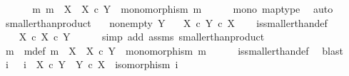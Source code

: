 \begin{isabellebody}
\ \ \isamarkupfalse%
\isanewline
\isanewline
\ \ \isamarkupfalse%
\ {\isachardoublequoteopen}{\isasymexists}m{\isachardot}{\kern0pt}\ m\ {\isacharcolon}{\kern0pt}\ X\ {\isasymrightarrow}\ X\ {\isasymtimes}\isactrlsub c\ Y\ {\isasymand}\ monomorphism\ m{\isachardoublequoteclose}\isanewline
\ \ \ \ \isamarkupfalse%
\ mono\ map{\isacharunderscore}{\kern0pt}type\ \isamarkupfalse%
\ auto\isanewline
{}\isamarkupfalse%
%
\endisatagproof
{\isafoldproof}%
%
\isadelimproof
\isanewline
%
\endisadelimproof
\isanewline
{}\isamarkupfalse%
\ smaller{\isacharunderscore}{\kern0pt}than{\isacharunderscore}{\kern0pt}product{}{\isacharcolon}{\kern0pt}\isanewline
\ \ \ {\isachardoublequoteopen}nonempty\ Y{\isachardoublequoteclose}\isanewline
\ \ \ {\isachardoublequoteopen}X\ {\isasymle}\isactrlsub c\ Y\ {\isasymtimes}\isactrlsub c\ X{\isachardoublequoteclose}\isanewline
%
\isadelimproof
\ \ %
\endisadelimproof
%
\isatagproof
{}\isamarkupfalse%
\ is{\isacharunderscore}{\kern0pt}smaller{\isacharunderscore}{\kern0pt}than{\isacharunderscore}{\kern0pt}def\ \ \isanewline
{}\isamarkupfalse%
\ {\isacharminus}{\kern0pt}\ \isanewline
\ \ \isamarkupfalse%
\ {\isachardoublequoteopen}X\ {\isasymle}\isactrlsub c\ X\ {\isasymtimes}\isactrlsub c\ Y{\isachardoublequoteclose}\isanewline
\ \ \ \ \isamarkupfalse%
\ {\isacharparenleft}{\kern0pt}simp\ add{\isacharcolon}{\kern0pt}\ assms\ smaller{\isacharunderscore}{\kern0pt}than{\isacharunderscore}{\kern0pt}product{}{\isacharparenright}{\kern0pt}\isanewline
\ \ \isamarkupfalse%
\ \isamarkupfalse%
\ m\ \ m{\isacharunderscore}{\kern0pt}def{\isacharcolon}{\kern0pt}\ {\isachardoublequoteopen}m\ {\isacharcolon}{\kern0pt}\ X\ {\isasymrightarrow}\ X\ {\isasymtimes}\isactrlsub c\ Y\ {\isasymand}\ monomorphism\ m{\isachardoublequoteclose}\isanewline
\ \ \ \ \isamarkupfalse%
\ is{\isacharunderscore}{\kern0pt}smaller{\isacharunderscore}{\kern0pt}than{\isacharunderscore}{\kern0pt}def\ \isamarkupfalse%
\ blast\isanewline
\ \ \isamarkupfalse%
\ i\ \ \ {\isachardoublequoteopen}i\ {\isacharcolon}{\kern0pt}\ {\isacharparenleft}{\kern0pt}X\ {\isasymtimes}\isactrlsub c\ Y{\isacharparenright}{\kern0pt}\ {\isasymrightarrow}\ {\isacharparenleft}{\kern0pt}Y\ {\isasymtimes}\isactrlsub c\ X{\isacharparenright}{\kern0pt}\ {\isasymand}\ isomorphism\ i{\isachardoublequoteclose}\isanewline

\end{isabellebody}
